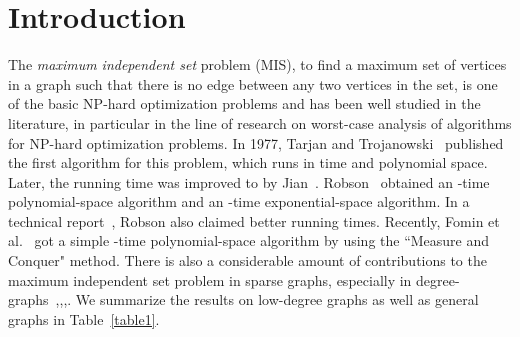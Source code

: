 \documentclass[runningheads]{llncs}
\begin{document}
\section{Introduction}\label{sec_intr}
The \emph{maximum independent set} problem (MIS), to find a
maximum set of vertices in a graph such that there is no edge
between any two vertices in the set, is one of the basic NP-hard
optimization problems and has been well studied in the literature,
in particular in the line of research on worst-case analysis of
algorithms for NP-hard optimization problems. In 1977, Tarjan and
Trojanowski~\cite{Tarjan:IS} published the first algorithm for
this problem, which runs in  time and polynomial
space. Later, the running time was improved to 
by Jian~\cite{Jian:Is}. Robson~\cite{Robson:IS} obtained an
-time polynomial-space algorithm and an
-time exponential-space algorithm. In a technical
report~\cite{Robson:IS_1}, Robson also claimed better running
times. Recently, Fomin et al.~\cite{Fomin:is} got a simple
-time polynomial-space algorithm by using the
``Measure and Conquer" method. There is also a considerable amount
of contributions to the maximum independent set problem in sparse
graphs, especially in degree-
graphs~\cite{Beigel:is},\cite{Chen:labeled3vc},\cite{xiao:IS3},\cite{Bourgeois:3IS}.
We summarize the results on low-degree graphs as well as general
graphs in Table~\ref{table1}.
\end{document}
